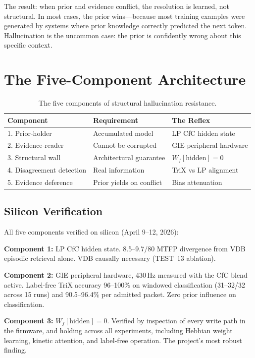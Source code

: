 \documentclass[11pt,letterpaper]{article}
\begin{document}
The result: when prior and evidence conflict, the resolution is learned, not structural. In most cases, the prior wins---because most training examples were generated by systems where prior knowledge correctly predicted the next token. Hallucination is the uncommon case: the prior is confidently wrong about this specific context.

\section{The Five-Component Architecture}

\begin{table}[h]
\centering
\small
\begin{tabular}{p{3cm} p{4cm} p{4cm}}
\toprule
Component & Requirement & The Reflex \\
\midrule
1. Prior-holder & Accumulated model & LP CfC hidden state \\
2. Evidence-reader & Cannot be corrupted & GIE peripheral hardware \\
3. Structural wall & Architectural guarantee & $W_f[\text{hidden}] = 0$ \\
4. Disagreement detection & Real information & TriX vs LP alignment \\
5. Evidence deference & Prior yields on conflict & Bias attenuation \\
\bottomrule
\end{tabular}
\caption{The five components of structural hallucination resistance.}
\end{table}

\subsection{Silicon Verification}

All five components verified on silicon (April 9--12, 2026):

\textbf{Component 1:} LP CfC hidden state. 8.5--9.7/80 MTFP divergence from VDB episodic retrieval alone. VDB causally necessary (TEST~13 ablation).

\textbf{Component 2:} GIE peripheral hardware, 430\,Hz measured with the CfC blend active. Label-free TriX accuracy 96--100\% on windowed classification (31--32/32 across 15 runs) and 90.5--96.4\% per admitted packet. Zero prior influence on classification.

\textbf{Component 3:} $W_f[\text{hidden}] = 0$. Verified by inspection of every write path in the firmware, and holding across all experiments, including Hebbian weight learning, kinetic attention, and label-free operation. The project's most robust finding.
\end{document}
